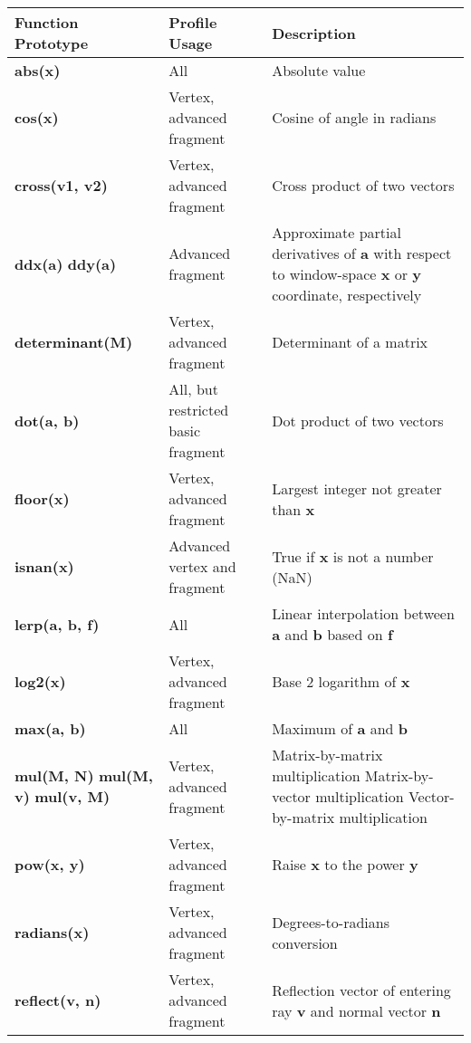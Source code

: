 \documentclass[../main.tex]{subfiles}
\begin{document}
\begin{table}
\centering
\begin{tabular}{ p{3cm} p{3cm} p{5cm}  } 

Function Prototype & Profile Usage & Description \\
\hline

\textbf{abs(x)} & All & Absolute value \\
\hline
\textbf{cos(x)} & Vertex, advanced fragment & Cosine of angle in radians \\
\hline
\textbf{cross(v1, v2)} & Vertex, advanced fragment & Cross product of two vectors \\
\hline
\textbf{ddx(a)} \newline \textbf{ddy(a)} & Advanced fragment & Approximate partial derivatives of \textbf{a} with respect to window-space \textbf{x} or \textbf{y} coordinate, respectively \\
\hline
\textbf{determinant(M)} & Vertex, advanced fragment & Determinant of a matrix \\
\hline
\textbf{dot(a, b)} & All, but restricted basic fragment & Dot product of two vectors \\
\hline
\textbf{floor(x)} & Vertex, advanced fragment & Largest integer not greater than \textbf{x} \\
\hline
\textbf{isnan(x)} & Advanced vertex and fragment & True if \textbf{x} is not a number (NaN) \\
\hline
\textbf{lerp(a, b, f)} & All & Linear interpolation between \textbf{a} and \textbf{b} based on \textbf{f} \\
\hline
\textbf{log2(x)} & Vertex, advanced fragment & Base 2 logarithm of \textbf{x} \\
\hline
\textbf{max(a, b)} & All & Maximum of \textbf{a} and \textbf{b} \\
\hline
\textbf{mul(M, N)} \newline \textbf{mul(M, v)} \newline \textbf{mul(v, M)} & Vertex, advanced fragment & 
Matrix-by-matrix multiplication \newline Matrix-by-vector multiplication \newline Vector-by-matrix multiplication \\
\hline
\textbf{pow(x, y)} & Vertex, advanced fragment & Raise \textbf{x} to the power \textbf{y} \\
\hline
\textbf{radians(x)} & Vertex, advanced fragment & Degrees-to-radians conversion \\
\hline
\textbf{reflect(v, n)} & Vertex, advanced fragment & Reflection vector of entering ray \textbf{v} and normal vector \textbf{n} \\

\end{tabular}
\end{table}
\end{document}
